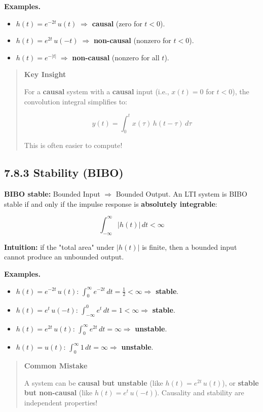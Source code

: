 \documentclass[11pt]{article}
\begin{document}
\textbf{Examples.}

\begin{itemize}
  \item $h(t) = e^{-2t}\,u(t)\;\Rightarrow$ \textbf{causal} (zero for $t<0$).
  \item $h(t) = e^{2t}\,u(-t)\;\Rightarrow$ \textbf{non-causal} (nonzero for $t<0$).
  \item $h(t) = e^{-|t|}\;\Rightarrow$ \textbf{non-causal} (nonzero for all $t$).
\end{itemize}

\begin{quote}
\textbf{Key Insight}

For a \textbf{causal} system with a \textbf{causal} input (i.e., $x(t) = 0$ for $t<0$), the convolution integral simplifies to:

\[y(t) = \int_0^t x(\tau)\,h(t-\tau)\,d\tau\]

This is often easier to compute!
\end{quote}

\subsection*{7.8.3 Stability (BIBO)}

\textbf{BIBO stable:} Bounded Input $\Rightarrow$ Bounded Output. An LTI system is BIBO stable if and only if the impulse response is \textbf{absolutely integrable}:

\[\boxed{\;\int_{-\infty}^{\infty} |h(t)|\,dt < \infty\;}\]

\textbf{Intuition:} if the "total area" under $|h(t)|$ is finite, then a bounded input cannot produce an unbounded output.

\textbf{Examples.}

\begin{itemize}
  \item $h(t) = e^{-2t}\,u(t)$: $\int_0^{\infty} e^{-2t}\,dt = \tfrac{1}{2} < \infty \Rightarrow$ \textbf{stable}.
  \item $h(t) = e^{t}\,u(-t)$: $\int_{-\infty}^0 e^{t}\,dt = 1 < \infty \Rightarrow$ \textbf{stable}.
  \item $h(t) = e^{2t}\,u(t)$: $\int_0^{\infty} e^{2t}\,dt = \infty \Rightarrow$ \textbf{unstable}.
  \item $h(t) = u(t)$: $\int_0^{\infty} 1\,dt = \infty \Rightarrow$ \textbf{unstable}.
\end{itemize}

\begin{quote}
\textbf{Common Mistake}

A system can be \textbf{causal but unstable} (like $h(t) = e^{2t}\,u(t)$), or \textbf{stable but non-causal} (like $h(t) = e^{t}\,u(-t)$). Causality and stability are independent properties!
\end{quote}
\end{document}
